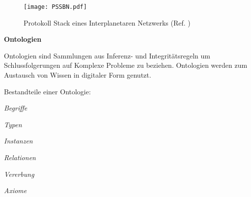 \begin{figure}[H]
\centering
\texttt{[image: PSSBN.pdf]}
\caption{Protokoll Stack eines Interplanetaren Netzwerks (Ref.
\cite{DTNBundle})}
\label{fig:PSSBN}
\end{figure}



\textbf{Ontologien}

Ontologien sind Sammlungen aus Inferenz- und Integrit{\"a}tsregeln um
Schlussfolgerungen auf Komplexe Probleme zu beziehen. Ontologien werden zum
Austausch von Wissen in digitaler Form genutzt.

Bestandteile einer Ontologie:

 \begin{compactenum}[I]
     \item \textit{Begriffe}
     \item \textit{Typen}
     \item \textit{Instanzen}
     \item \textit{Relationen}
     \item \textit{Vererbung}
     \item \textit{Axiome}
   \end{compactenum}

